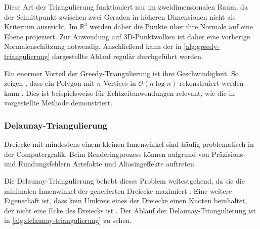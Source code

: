 Diese Art der Triangulierung funktioniert nur im zweidimensionalen Raum, da der Schnittpunkt zwischen zwei Geraden in höheren Dimensionen nicht als Kriterium ausreicht.
Im $\mathbb{R}^3$ werden daher die Punkte über ihre Normale auf eine Ebene projeziert.
Zur Anwendung auf 3D-Punktwolken ist daher eine vorherige Normalenschätzung notwendig.
Anschließend kann der in \autoref{alg:greedy-triangulierung} dargestellte Ablauf regulär durchgeführt werden.

Ein enormer Vorteil der Greedy-Triangulierung ist ihre Geschwindigkeit.
So zeigen \citeauthor{berg2000comp}, dass ein Polygon mit $n$ Vertices in $\mathcal{O}(n \log n)$ rekonstruiert werden kann \cite[56--58]{berg2000comp}.
Dies ist beispielsweise für Echtzeitanwendungen relevant, wie die in \cite{Marton09ICRA} vorgestellte Methode demonstriert.

\subsubsection{Delaunay-Triangulierung}
\label{subsubsec:delaunay-triangulierung}

Dreiecke mit mindestens einem kleinen Innenwinkel sind häufig problematisch in der Computergrafik.
Beim Renderingprozess können aufgrund von Präzisions- und Rundungsfehlern Artefakte und Aliasingeffekte auftreten.

Die Delaunay-Triangulierung behebt dieses Problem weitestgehend, da sie die minimalen Innenwinkel der generierten Dreiecke maximiert \cite[199]{berg2000comp}.
Eine weitere Eigenschaft ist, dass kein Umkreis eines der Dreiecke einen Knoten beinhaltet, der nicht eine Ecke des Dreiecks ist \cite[196]{berg2000comp}. Der Ablauf der Delaunay-Triangulierung ist in \autoref{alg:delaunay-triangulierung} zu sehen.

